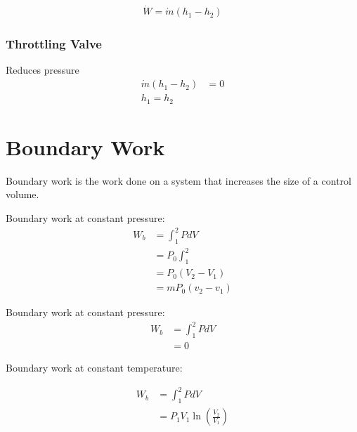 \begin{align}
	\dot{W} = \dot{m}(h_1-h_2)
\end{align}


\subsubsection{Throttling Valve}
Reduces pressure
\begin{align}
	\dot{m}(h_1-h_2)&=0\\ 
	h_1=h_2
\end{align}


\section{Boundary Work}
Boundary work is the work done on a system that increases the size of a control volume.

Boundary work at constant pressure:
\begin{align}
	W_b &= \int_1^2 PdV\\ 
	&= P_0 \int_1^2\\ 
	&=P_0(V_2-V_1)\\
	&=mP_0(v_2-v_1)
\end{align}



Boundary work at constant pressure:
\begin{align}
	W_b &= \int_1^2 PdV\\ 
	&= 0
\end{align}

Boundary work at constant temperature:

\begin{align}
	W_b &= \int_1^2 PdV\\ 
	&= P_1V_1\ln(\frac{V_2}{V_1})
\end{align}

